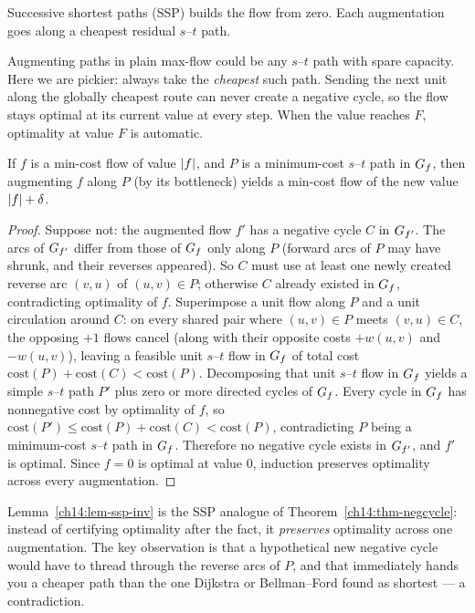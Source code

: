 Successive shortest paths (SSP) builds the flow from zero. Each augmentation goes along a cheapest residual $s$--$t$ path.

\begin{intuitionbox}
Augmenting paths in plain max-flow could be any $s$--$t$ path with spare capacity. Here we are pickier: always take the \emph{cheapest} such path. Sending the next unit along the globally cheapest route can never create a negative cycle, so the flow stays optimal at its current value at every step. When the value reaches $F$, optimality at value $F$ is automatic.
\end{intuitionbox}

\begin{lemma}\label{ch14:lem-ssp-inv}
If $f$ is a min-cost flow of value $\lvert f\rvert$, and $P$ is a minimum-cost $s$--$t$ path in $G_f$, then augmenting $f$ along $P$ (by its bottleneck) yields a min-cost flow of the new value $\lvert f\rvert + \delta$.
\end{lemma}

\begin{proof}
Suppose not: the augmented flow $f'$ has a negative cycle $C$ in $G_{f'}$. The arcs of $G_{f'}$ differ from those of $G_f$ only along $P$ (forward arcs of $P$ may have shrunk, and their reverses appeared). So $C$ must use at least one newly created reverse arc $(v,u)$ of $(u,v)\in P$; otherwise $C$ already existed in $G_f$, contradicting optimality of $f$. Superimpose a unit flow along $P$ and a unit circulation around $C$: on every shared pair where $(u,v)\in P$ meets $(v,u)\in C$, the opposing $+1$ flows cancel (along with their opposite costs $+w(u,v)$ and $-w(u,v)$), leaving a feasible unit $s$--$t$ flow in $G_f$ of total cost $\mathrm{cost}(P)+\mathrm{cost}(C) < \mathrm{cost}(P)$. Decomposing that unit $s$--$t$ flow in $G_f$ yields a simple $s$--$t$ path $P'$ plus zero or more directed cycles of $G_f$. Every cycle in $G_f$ has nonnegative cost by optimality of $f$, so $\mathrm{cost}(P') \le \mathrm{cost}(P)+\mathrm{cost}(C) < \mathrm{cost}(P)$, contradicting $P$ being a minimum-cost $s$--$t$ path in $G_f$. Therefore no negative cycle exists in $G_{f'}$, and $f'$ is optimal. Since $f=0$ is optimal at value $0$, induction preserves optimality across every augmentation.
\end{proof}

\begin{whybox}
Lemma~\ref{ch14:lem-ssp-inv} is the SSP analogue of Theorem~\ref{ch14:thm-negcycle}: instead of certifying optimality after the fact, it \emph{preserves} optimality across one augmentation. The key observation is that a hypothetical new negative cycle would have to thread through the reverse arcs of $P$, and that immediately hands you a cheaper path than the one Dijkstra or Bellman--Ford found as shortest --- a contradiction.
\end{whybox}

